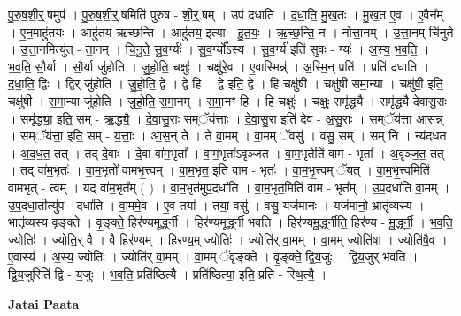 \documentclass[17pt]{extarticle}
\begin{document}
पु॒रु॒ष॒शी॒र्॒.षमुप॑ । पु॒रु॒ष॒शी॒र्॒.षमिति॑ पुरुष - शी॒र्॒.षम् । उप॑ दधाति । द॒धा॒ति॒ मु॒ख॒तः । मु॒ख॒त ए॒व । ए॒वैन᳚म् । ए॒न॒माहु॑तयः । आहु॑तय ऋच्छन्ति । आहु॑तय॒ इत्या - हु॒त॒यः॒ । ऋ॒च्छ॒न्ति॒ न । नोत्ता॒नम् । उ॒त्ता॒नम् चि॑नुते । उ॒त्ता॒नमित्यु॑त् - ता॒नम् । चि॒नु॒ते॒ सु॒व॒र्ग्यः॑ । सु॒व॒र्ग्यो᳚ऽस्य । सु॒व॒र्ग्य॑ इति॑ सुवः - ग्यः॑ । अ॒स्य॒ भ॒व॒ति॒ । भ॒व॒ति॒ सौ॒र्या । सौ॒र्या जु॑होति । जु॒हो॒ति॒ चक्षुः॑ । चक्षु॑रे॒व । ए॒वास्मिन्न्॑ । अ॒स्मि॒न् प्रति॑ । प्रति॑ दधाति । द॒धा॒ति॒ द्विः । द्विर् जु॑होति । जु॒हो॒ति॒ द्वे । द्वे हि । द्वे इति॒ द्वे । हि चक्षु॑षी । चक्षु॑षी समा॒न्या । चक्षु॑षी॒ इति॒ चक्षु॑षी । स॒मा॒न्या जु॑होति । जु॒हो॒ति॒ स॒मा॒नम् । स॒मा॒नꣳ हि । हि चक्षुः॑ । चक्षुः॒ समृ॑द्ध्यै । समृ॑द्ध्यै देवासु॒राः । समृ॑द्ध्या॒ इति॒ सम् - ऋ॒द्ध्यै॒ । दे॒वा॒सु॒राः सम्ॅय॑त्ताः । दे॒वा॒सु॒रा इति॑ देव - अ॒सु॒राः । सम्ॅय॑त्ता आसन्न् । सम्ॅय॑त्ता॒ इति॒ सम् - य॒त्ताः॒ । आ॒स॒न् ते । ते वा॒मम् । वा॒मम् ॅवसु॑ । वसु॒ सम् । सम् नि । न्य॑दधत । अ॒द॒ध॒त॒ तत् । तद् दे॒वाः । दे॒वा वा॑म॒भृता᳚ । वा॒म॒भृता॑ऽवृञ्जत । वा॒म॒भृतेति॑ वाम - भृता᳚ । अ॒वृ॒ञ्ज॒त॒ तत् । तद् वा॑म॒भृतः॑ । वा॒म॒भृतो॑ वामभृ॒त्त्वम् । वा॒म॒भृत॒ इति॑ वाम - भृतः॑ । वा॒म॒भृ॒त्त्वम् ॅयत् । वा॒म॒भृ॒त्त्वमिति॑ वामभृत् - त्वम् । यद् वा॑म॒भृत᳚म् ( ) । वा॒म॒भृत॑मुप॒दधा॑ति । वा॒म॒भृत॒मिति॑ वाम - भृत᳚म् । उ॒प॒दधा॑ति वा॒मम् । उ॒प॒दधा॒तीत्यु॑प - दधा॑ति । वा॒ममे॒व । ए॒व तया᳚ । तया॒ वसु॑ । वसु॒ यज॑मानः । यज॑मानो॒ भ्रातृ॑व्यस्य । भातृ॑व्यस्य वृङ्क्ते । वृ॒ङ्क्ते॒ हिर॑ण्यमूर्द्ध्नी । हिर॑ण्यमूर्द्ध्नी भवति । हिर॑ण्यमू॒र्द्ध्नीति॒ हिर॑ण्य - मू॒र्द्ध्नी॒ । भ॒व॒ति॒ ज्योतिः॑ । ज्योति॒र् वै । वै हिर॑ण्यम् । हिर॑ण्य॒म् ज्योतिः॑ । ज्योति॑र् वा॒मम् । वा॒मम् ज्योति॑षा । ज्योति॑षै॒व । ए॒वास्य॑ । अ॒स्य॒ ज्योतिः॑ । ज्योति॑र् वा॒मम् । वा॒मम् ॅवृ॑ङ्क्ते । वृ॒ङ्क्ते॒ द्वि॒य॒जुः । द्वि॒य॒जुर् भ॑वति । द्वि॒य॒जुरिति॑ द्वि - य॒जुः । भ॒व॒ति॒ प्रति॑ष्ठित्यै । प्रति॑ष्ठित्या॒ इति॒ प्रति॑ - स्थि॒त्यै॒ । \newline

\textbf{Jatai Paata} \newline
\end{document}
